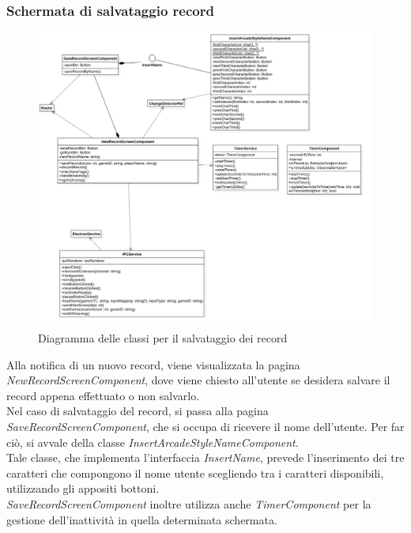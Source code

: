 \subsubsection{Schermata di salvataggio record}
\begin{figure}[h]
    \centering
    \includegraphics[width=340pt]{images/prog/NewRecord.png}
    \caption{Diagramma delle classi per il salvataggio dei record}
    \label{fig:attore}
\end{figure}
Alla notifica di un nuovo record, viene visualizzata la pagina \emph{NewRecordScreenComponent}, dove viene chiesto all'utente se desidera salvare il record appena effettuato o non salvarlo.\\
Nel caso di salvataggio del record, si passa alla pagina \emph{SaveRecordScreenComponent}, che si occupa di ricevere il nome dell'utente. Per far ciò, si avvale della classe \emph{InsertArcadeStyleNameComponent}.\\
Tale classe, che implementa l'interfaccia \emph{InsertName}, prevede l'inserimento dei tre caratteri che compongono il nome utente scegliendo tra i caratteri disponibili, utilizzando gli appositi bottoni.\\
\emph{SaveRecordScreenComponent} inoltre utilizza anche \emph{TimerComponent} per la gestione dell'inattività in quella determinata schermata.
